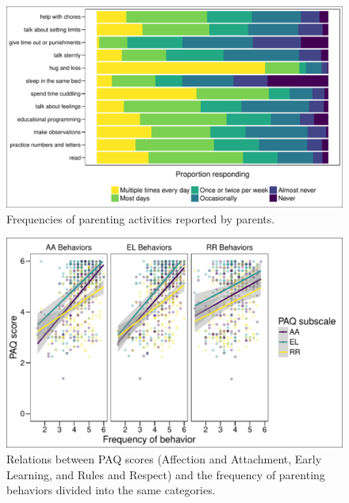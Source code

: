 \documentclass[man]{apa6}
\theoremstyle{definition}
\theoremstyle{definition}
\theoremstyle{definition}
\theoremstyle{remark}
\begin{document}
\begin{figure}
\centering
\includegraphics{PAQ_paper_files/figure-latex/behavefreq-1.pdf}
\caption{\label{fig:behavefreq}Frequencies of parenting activities reported
by parents.}
\end{figure}

\begin{figure}
\centering
\includegraphics{PAQ_paper_files/figure-latex/behavepaq-1.pdf}
\caption{\label{fig:behavepaq}Relations between PAQ scores (Affection and
Attachment, Early Learning, and Rules and Respect) and the frequency of
parenting behaviors divided into the same categories.}
\end{figure}
\end{document}
